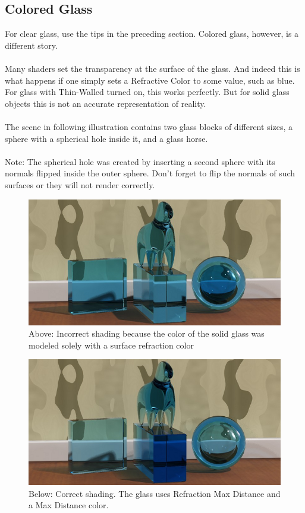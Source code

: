 \documentclass[10pt,a4paper]{article}
\begin{document}
\subsection{Colored Glass}
For clear glass, use the tips in the preceding section. Colored glass, however, is a different story.
\\
\\
Many shaders set the transparency at the surface of the glass. And indeed this is what happens if one simply sets a Refractive Color to some value, such as blue. 
For glass with Thin-Walled turned on, this works perfectly. But for solid glass objects this is not an accurate representation of reality.
\\
\\
The scene in following illustration contains two glass blocks of different sizes, a sphere with a spherical hole inside it, and a glass horse.
\\
\\
Note: The spherical hole was created by inserting a second sphere with its normals flipped inside the outer sphere. 
Don’t forget to flip the normals of such surfaces or they will not render correctly.

\begin{figure}[tbh]
	\centering
	\includegraphics[width=0.5\linewidth]{figure/incorrect_shading}
	\caption{Above: Incorrect shading because the color of the solid glass was modeled solely with a surface refraction color}
	\label{fig:incorrectshading}
\end{figure}

\begin{figure}[tbh]
	\centering
	\includegraphics[width=0.5\linewidth]{figure/correct_shading}
	\caption{Below: Correct shading. The glass uses Refraction  Max Distance and a Max Distance color.}
	\label{fig:correctshading}
\end{figure}
\end{document}
